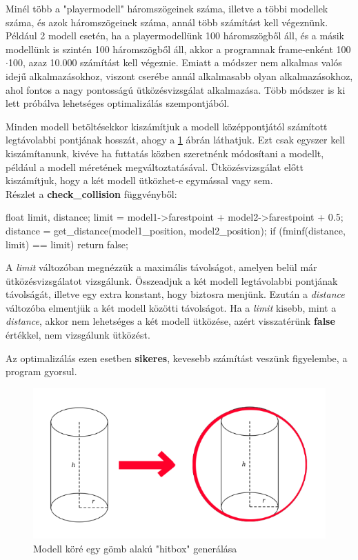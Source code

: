 
Minél több a "playermodell" háromszögeinek száma, illetve a többi modellek száma, és azok háromszögeinek száma, annál több számítást kell végeznünk. Például 2 modell esetén, ha a playermodellünk 100 háromszögből áll, és a másik modellünk is szintén 100 háromszögből áll, akkor a programnak frame-enként 100$\cdot$100, azaz 10.000 számítást kell végeznie. Emiatt a módszer nem alkalmas valós idejű alkalmazásokhoz, viszont cserébe annál alkalmasabb olyan alkalmazásokhoz, ahol fontos a nagy pontosságú ütközésvizsgálat alkalmazása. Több módszer is ki lett próbálva lehetséges optimalizálás szempontjából.

Minden modell betöltésekkor kiszámítjuk a modell középpontjától számított legtávolabbi pontjának hosszát, ahogy a \ref{fig:opt_1} ábrán láthatjuk. Ezt csak egyszer kell kiszámítanunk, kivéve ha futtatás közben szeretnénk módosítani a modellt, például a modell méretének megváltoztatásával. Ütközésvizsgálat előtt kiszámítjuk, hogy a két modell ütközhet-e egymással vagy sem.
\\
Részlet a \textbf{check\_collision} függvényből:
\begin{cpp}
float limit, distance;
limit = model1->farestpoint + model2->farestpoint + 0.5;
distance = get_distance(model1_position, model2_position);
if (fminf(distance, limit) == limit)
{
    return false;
}
\end{cpp}
\newpage
A \textit{limit} változóban megnézzük a maximális távolságot, amelyen belül már ütközésvizsgálatot vizsgálunk. Összeadjuk a két modell legtávolabbi pontjának távolságát, illetve egy extra konstant, hogy biztosra menjünk. Ezután a \textit{distance} változóba elmentjük a két modell közötti távolságot. Ha a \textit{limit} kisebb, mint a \textit{distance}, akkor nem lehetséges a két modell ütközése, azért visszatérünk \textbf{false} értékkel, nem vizsgálunk ütközést.

Az optimalizálás ezen esetben \textbf{sikeres}, kevesebb számítást veszünk figyelembe, a program gyorsul.
\begin{figure}[h]
	\centering
	\includegraphics[width=13truecm, height=7.5truecm]{images/opt_5.1.png}
	\caption{Modell köré egy gömb alakú "hitbox" generálása}
	\label{fig:opt_1}
\end{figure}

